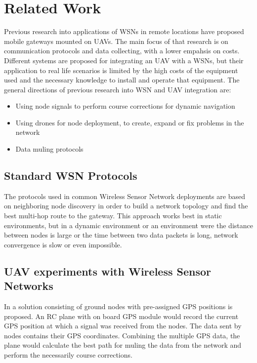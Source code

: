 \normalfont\normalsize
\chapter{Related Work}
\label{chap:related}

Previous research into applications of WSNs in remote locations have proposed mobile gateways mounted on UAVs. The main focus of that research is on communication protocols and data collecting, with a lower empahsis on costs. Different systems are proposed for integrating an UAV with a WSNs, but their application to real life scenarios is limited by the high costs of the equipment used and the necessary knowledge to install and operate that equipment.
The general directions of previous research into WSN and UAV integration are:
\begin{itemize}

\item Using node signals to perform course corrections for dynamic navigation \cite{savarese2001location}
\item Using drones for node deployment, to create, expand or fix problems in the network \cite{akyildiz2002wireless}
\item Data muling protocols

\end{itemize}

\section{Standard WSN Protocols}

The protocols used in common Wireless Sensor Network deployments are based on neighboring node discovery in order to build a network topology and find the best multi-hop route to the gateway. This approach works best in static environments, but in a dynamic environment or an environment were the distance between nodes is large or the time between two data packets is long, network convergence is slow or even impossible.

\section{UAV experiments with Wireless Sensor Networks}

In \cite{teh2008experiments} a solution consisting of ground nodes with pre-assigned GPS positions is proposed. An RC plane with on board GPS module would record the current GPS position at which a signal was received from the nodes. The data sent by nodes contains their GPS coordinates. Combining the multiple GPS data, the plane would calculate the best path for muling the data from the network and perform the necessarily course corrections.

